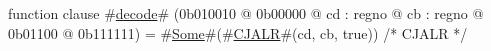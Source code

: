 function clause #\hyperref[zdecode]{decode}# (0b010010 @ 0b00000 @ cd : regno @ cb : regno @    0b01100 @ 0b111111) = #\hyperref[zSome]{Some}#(#\hyperref[zCJALR]{CJALR}#(cd, cb, true)) /* CJALR */
